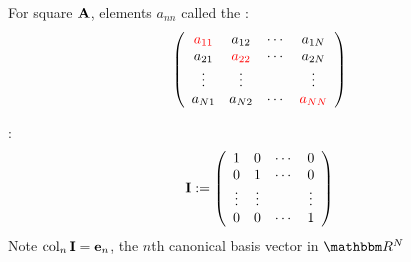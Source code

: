 \begin{frame}
    
    \vspace{2em}
    For square $\mathbf A$, elements $a_{nn}$ called the :
    \begin{equation*}
        \left(
        \begin{array}{cccc}
            \textcolor{red}{a_{11}} & a_{12} & \cdots & a_{1N} \\
            a_{21} & \textcolor{red}{a_{22}} & \cdots & a_{2N} \\
            \vdots & \vdots &  & \vdots \\
            a_{N1} & a_{N2} & \cdots & \textcolor{red}{a_{NN}} \\
        \end{array}
        \right)
    \end{equation*}

    :
    \begin{equation*}
        \mathbf I := 
        \left(
        \begin{array}{cccc}
            1 & 0 & \cdots & 0 \\
            0 & 1 & \cdots & 0 \\
            \vdots & \vdots &  & \vdots \\
            0 & 0 & \cdots & 1 \\
        \end{array}
        \right)
    \end{equation*}
    Note  $\operatorname{col}_n \mathbf I = {\mathbf e}_n$, the $n$th canonical basis vector in $\RR^N$
    

\end{frame}


